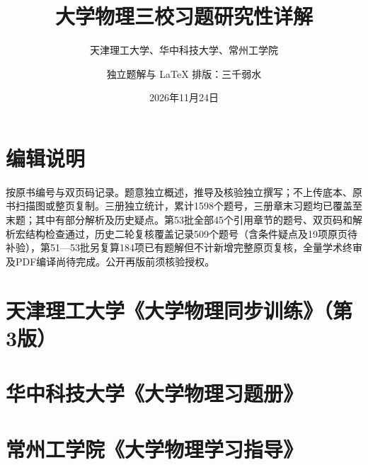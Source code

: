 \documentclass[lang=cn,color=blue,11pt]{elegantbook}
\title{大学物理三校习题研究性详解}
\subtitle{天津理工大学、华中科技大学、常州工学院}
\author{独立题解与 LaTeX 排版：三千弱水}
\date{2026年11月24日}
\begin{document}
\maketitle
\frontmatter
\chapter*{编辑说明}
按原书编号与双页码记录。题意独立概述，推导及核验独立撰写；不上传底本、原书扫描图或整页复制。三册独立统计，累计1598个题号，三册章末习题均已覆盖至末题；其中有部分解析及历史疑点。第53批全部45个引用章节的题号、双页码和解析宏结构检查通过，历史二轮复核覆盖记录509个题号（含条件疑点及19项原页待补验），第51—53批另复算184项已有题解但不计新增完整原页复核，全量学术终审及PDF编译尚待完成。公开再版前须核验授权。
\tableofcontents
\mainmatter
\chapter{天津理工大学《大学物理同步训练》（第3版）}
















\chapter{华中科技大学《大学物理习题册》}
















\chapter{常州工学院《大学物理学习指导》}













\end{document}
